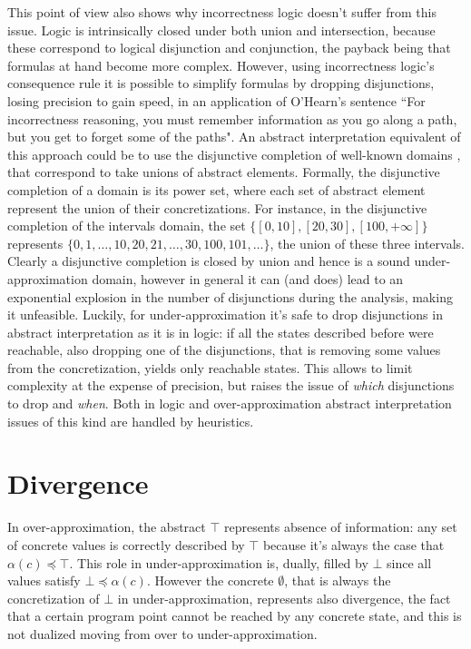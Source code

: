 This point of view also shows why incorrectness logic doesn't suffer from this issue. Logic is intrinsically closed under both union and intersection, because these correspond to logical disjunction and conjunction, the payback being that formulas at hand become more complex. However, using incorrectness logic's consequence rule it is possible to simplify formulas by dropping disjunctions, losing precision to gain speed, in an application of O'Hearn's sentence \cite{ohearn-incorrectness-logic} ``For incorrectness reasoning, you must remember information as you go along a path, but you get to forget some of the paths".
An abstract interpretation equivalent of this approach could be to use the disjunctive completion of well-known domains \cite{under-approx-disjunctive-completion}, that correspond to take unions of abstract elements. Formally, the disjunctive completion of a domain is its power set, where each set of abstract element represent the union of their concretizations. For instance, in the disjunctive completion of the intervals domain, the set $\{ [0, 10], [20, 30], [100, +\infty] \}$ represents $\{ 0, 1, \dots, 10, 20, 21, \dots, 30, 100, 101, \dots \}$, the union of these three intervals. Clearly a disjunctive completion is closed by union and hence is a sound under-approximation domain, however in general it can (and does) lead to an exponential explosion in the number of disjunctions during the analysis, making it unfeasible. Luckily, for under-approximation it's safe to drop disjunctions in abstract interpretation as it is in logic: if all the states described before were reachable, also dropping one of the disjunctions, that is removing some values from the concretization, yields only reachable states. This allows to limit complexity at the expense of precision, but raises the issue of \textit{which} disjunctions to drop and \textit{when}. Both in logic and over-approximation abstract interpretation issues of this kind are handled by heuristics.

\section{Divergence}
In over-approximation, the abstract $\top$ represents absence of information: any set of concrete values is correctly described by $\top$ because it's always the case that $\alpha(c) \preceq \top$. This role in under-approximation is, dually, filled by $\bot$ since all values satisfy $\bot \preceq \alpha(c)$.
However the concrete $\emptyset$, that is always the concretization of $\bot$ in under-approximation, represents also divergence, the fact that a certain program point cannot be reached by any concrete state, and this is not dualized moving from over to under-approximation.

